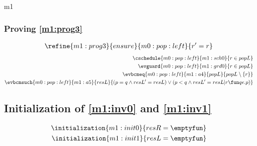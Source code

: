 \documentclass[12pt]{amsart}
\begin{document}
\begin{machine}{m1}
\subsubsection{Proving \ref{m1:prog3}}
\begin{align*}
\refine{m1:prog3}{ensure}{m0:pop:left}{ \index{r}{r' = r} }
\end{align*}
\begin{align*}
\cschedule{m0:pop:left}{m1:sch0}{ r \in popL }
\\ \evguard{m0:pop:left}{m1:grd0}{ r \in popL }
\\ \evbcmeq{m0:pop:left}{m1:a4}
	{popL}{ popL \setminus \{ r \} }
\\ \evbcmsuch{m0:pop:left}{m1:a5}{resL}
	{ 	 (p = q \land resL' = resL) 
	\lor (p < q \land resL' = resL | r \fun qe.p) }
\end{align*}

\subsection{Initialization of \ref{m1:inv0} and \ref{m1:inv1}}

\begin{align*}
\initialization{m1:init0}{resR = \emptyfun}
\\ \initialization{m1:init1}{resL = \emptyfun}
\end{align*}

\end{machine}
 



\end{document}
